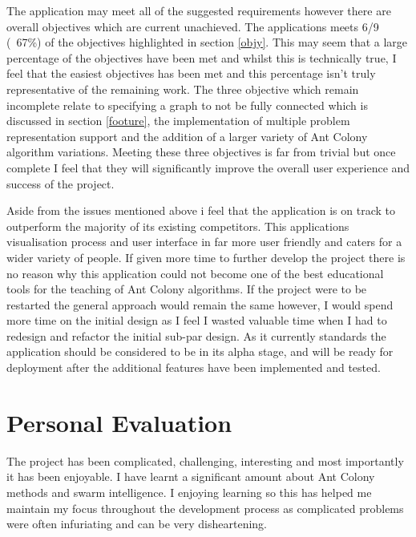 The application may meet all of the suggested requirements however there are overall objectives which are current unachieved. The applications meets 6/9 (~67\%) of the objectives highlighted in section \ref{objy}. This may seem that a large percentage of the objectives have been met and whilst this is technically true, I feel that the easiest objectives has been met and this percentage isn’t truly representative of the remaining work. The three objective which remain incomplete relate to specifying a graph to not be fully connected which is discussed in section \ref{footure}, the implementation of multiple problem representation support and the addition of a larger variety of Ant Colony algorithm variations. Meeting these three objectives is far from trivial but once complete I feel that they will significantly improve the overall user experience and success of the project. 

Aside from the issues mentioned above i feel that the application is on track to outperform the majority of its existing competitors. This applications visualisation process and user interface in far more user friendly and caters for a wider variety of people. If given more time to further develop the project there is no reason why this application could not become one of the best educational tools for the teaching of Ant Colony algorithms. If the project were to be restarted the general approach would remain the same however, I would spend more time on the initial design as I feel I wasted valuable time when I had to redesign and refactor the initial sub-par design. As it currently standards the application should be considered to be in its alpha stage, and will be ready for deployment after the additional features have been implemented and tested.

\section{Personal Evaluation}

The project has been complicated, challenging, interesting and most importantly it has been enjoyable. I have learnt a significant amount about Ant Colony methods and swarm intelligence. I enjoying learning so this has helped me maintain my focus throughout the development process as complicated problems were often infuriating and can be very disheartening.


